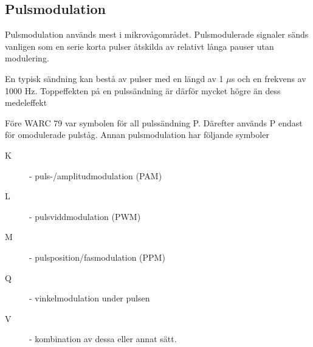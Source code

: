 \subsection{Pulsmodulation}

Pulsmodulation används mest i mikrovågområdet. Pulsmodulerade signaler sänds
vanligen som en serie korta pulser åtskilda av relativt långa pauser utan
modulering.

En typisk sändning kan bestå av pulser med en längd av 1 $\mu$s och en frekvens
av 1000 Hz. Toppeffekten på en pulssändning är därför mycket högre än dess
medeleffekt

Före WARC 79 var symbolen för all pulssändning P. Därefter används P endast för
omodulerade pulståg. Annan pulsmodulation har följande symboler

\begin{description}
\item[K] - puls-/amplitudmodulation (PAM)
\item[L] - pulsviddmodulation (PWM)
\item[M] - pulsposition/fasmodulation (PPM)
\item[Q] - vinkelmodulation under pulsen
\item[V] - kombination av dessa eller annat sätt.
\end{description}

